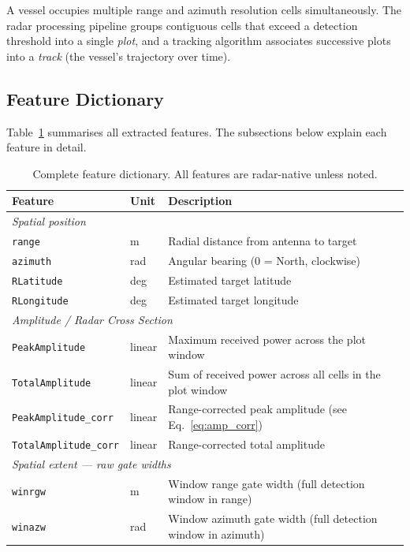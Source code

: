 \documentclass[12pt, a4paper]{article}
\begin{document}
A vessel occupies multiple range and azimuth resolution cells simultaneously.
The radar processing pipeline groups contiguous cells that exceed a detection
threshold into a single \emph{plot}, and a tracking algorithm associates
successive plots into a \emph{track} (the vessel's trajectory over time).

\subsection{Feature Dictionary}
\label{sec:features}

Table~\ref{tab:features} summarises all extracted features.
The subsections below explain each feature in detail.

\begin{table}[H]
\centering
\caption{Complete feature dictionary. All features are radar-native unless noted.}
\label{tab:features}
\begin{tabular}{llp{7cm}}
\toprule
\textbf{Feature} & \textbf{Unit} & \textbf{Description} \\
\midrule
\multicolumn{3}{l}{\textit{Spatial position}} \\
\texttt{range}              & m           & Radial distance from antenna to target \\
\texttt{azimuth}            & rad         & Angular bearing (0 = North, clockwise) \\
\texttt{RLatitude}          & deg         & Estimated target latitude \\
\texttt{RLongitude}         & deg         & Estimated target longitude \\
\midrule
\multicolumn{3}{l}{\textit{Amplitude / Radar Cross Section}} \\
\texttt{PeakAmplitude}      & linear      & Maximum received power across the plot window \\
\texttt{TotalAmplitude}     & linear      & Sum of received power across all cells in the plot window \\
\texttt{PeakAmplitude\_corr}  & linear    & Range-corrected peak amplitude (see Eq.~\ref{eq:amp_corr}) \\
\texttt{TotalAmplitude\_corr} & linear    & Range-corrected total amplitude \\
\midrule
\multicolumn{3}{l}{\textit{Spatial extent — raw gate widths}} \\
\texttt{winrgw}             & m           & Window range gate width (full detection window in range) \\
\texttt{winazw}             & rad         & Window azimuth gate width (full detection window in azimuth) \\

\end{tabular}
\end{table}
\end{document}
